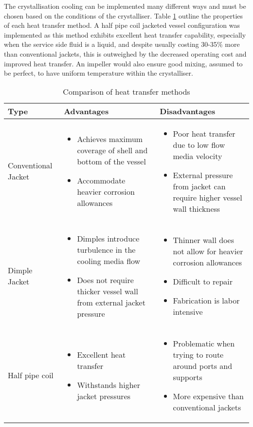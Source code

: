 The crystallisation cooling can be implemented many different ways and must be chosen based on the conditions of the crystalliser. Table \ref{tab:heatransfermethodstype} outline the properties of each heat transfer method. A half pipe coil jacketed vessel configuration was implemented as this method exhibits excellent heat transfer capability, especially when the service side fluid is a liquid, and despite usually costing 30-35\% more than conventional jackets, this is outweighed by the decreased operating cost and improved heat transfer. An impeller would also ensure good mixing, assumed to be perfect, to have uniform temperature within the crystalliser. 

\begin{table}
\caption{Comparison of heat transfer methods \cite{myerson_handbook_2019} }
\label{tab:heatransfermethodstype}
\begin{tabularx}{\linewidth}{lXX}
\toprule
Type & Advantages                 & Disadvantages                               \\ \midrule
Conventional Jacket & \begin{itemize}[label=+,leftmargin=1em]
  \item Achieves maximum coverage of shell and bottom of the vessel
  \item Accommodate heavier corrosion allowances
\end{itemize} & \begin{itemize}[label=-,leftmargin=1em]
  \item Poor heat transfer due to low flow media velocity
  \item External pressure from jacket can require higher vessel wall thickness 
\end{itemize} \\\midrule 
Dimple Jacket & \begin{itemize}[label=+,leftmargin=1em]
  \item Dimples introduce turbulence in the cooling media flow
  \item Does not require thicker vessel wall from external jacket pressure
\end{itemize} & \begin{itemize}[label=-,leftmargin=1em]
  \item Thinner wall does not allow for heavier corrosion allowances
  \item Difficult to repair
  \item Fabrication is labor intensive
\end{itemize} \\\midrule
Half pipe coil  &  \begin{itemize}[label=+,leftmargin=1em]
  \item Excellent heat transfer
  \item Withstands higher jacket pressures
\end{itemize} & \begin{itemize}[label=-,leftmargin=1em]
  \item Problematic when trying to route around ports and supports 
  \item More expensive than conventional jackets


\end{itemize}
\end{tabularx}
\end{table}
